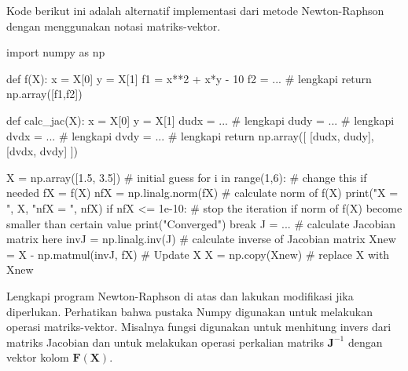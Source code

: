 Kode berikut ini adalah alternatif implementasi dari metode Newton-Raphson
dengan menggunakan notasi matriks-vektor.
\begin{pythoncode}
import numpy as np

def f(X):
    x = X[0]
    y = X[1]
    f1 = x**2 + x*y - 10
    f2 = ... # lengkapi 
    return np.array([f1,f2])

def calc_jac(X):
    x = X[0]
    y = X[1]
    dudx = ... # lengkapi
    dudy = ... # lengkapi
    dvdx = ... # lengkapi
    dvdy = ... # lengkapi
    return np.array([
        [dudx, dudy],
        [dvdx, dvdy]
    ])
    
X = np.array([1.5, 3.5]) # initial guess
for i in range(1,6): # change this if needed
    fX = f(X)
    nfX = np.linalg.norm(fX) # calculate norm of f(X)
    print("X = ", X, "nfX = ", nfX)
    if nfX <= 1e-10: # stop the iteration if norm of f(X) become smaller than certain value
        print("Converged")
        break
    J = ... # calculate Jacobian matrix here
    invJ = np.linalg.inv(J) # calculate inverse of Jacobian matrix
    Xnew = X - np.matmul(invJ, fX)  # Update X
    X = np.copy(Xnew)  # replace X with Xnew
\end{pythoncode}

\begin{soal}
Lengkapi program Newton-Raphson di atas dan lakukan modifikasi jika diperlukan.
Perhatikan bahwa pustaka Numpy digunakan untuk melakukan
operasi matriks-vektor. Misalnya fungsi  digunakan untuk
menhitung invers dari matriks Jacobian dan  untuk melakukan operasi
perkalian matriks $\mathbf{J}^{-1}$ dengan vektor kolom $\mathbf{F}(\mathbf{X})$.
\end{soal}